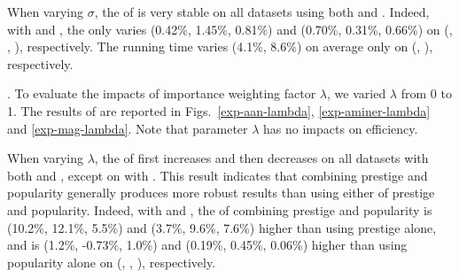 When varying $\sigma$, the \PairAcc of \ensemblerank is very stable on all datasets using both \recom and \fcita. Indeed, with \recom and \fcita, the \PairAcc only varies (0.42\%, 1.45\%, 0.81\%) and (0.70\%, 0.31\%, 0.66\%) on (\aan, \aminer, \magdata), respectively.
%
The running time varies (4.1\%, 8.6\%) on average only on (\aminer, \magdata), respectively.




.
To evaluate the impacts of importance weighting factor $\lambda$, we varied $\lambda$ from 0 to 1.
The results of \PairAcc are reported in Figs.~\ref{exp-aan-lambda}, \ref{exp-aminer-lambda} and \ref{exp-mag-lambda}. Note that parameter $\lambda$ has no impacts on efficiency.

When varying $\lambda$, the \PairAcc of \ensemblerank first increases and then decreases on all datasets with both \fcita and \recom, except on \aminer with \recom. 
This result indicates that combining prestige and popularity generally produces more robust results than using either of prestige and popularity.
Indeed, with \recom and \fcita, the \PairAcc of combining prestige and popularity is (10.2\%, 12.1\%, 5.5\%) and (3.7\%, 9.6\%, 7.6\%) higher than using prestige alone, and is (1.2\%, -0.73\%, 1.0\%) and (0.19\%, 0.45\%, 0.06\%) higher than using popularity alone on (\aan, \aminer, \magdata), respectively.






